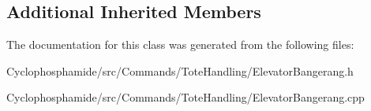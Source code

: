 \subsection*{Additional Inherited Members}


The documentation for this class was generated from the following files\+:\begin{DoxyCompactItemize}
\item 
Cyclophosphamide/src/\+Commands/\+Tote\+Handling/Elevator\+Bangerang.\+h\item 
Cyclophosphamide/src/\+Commands/\+Tote\+Handling/Elevator\+Bangerang.\+cpp\end{DoxyCompactItemize}
